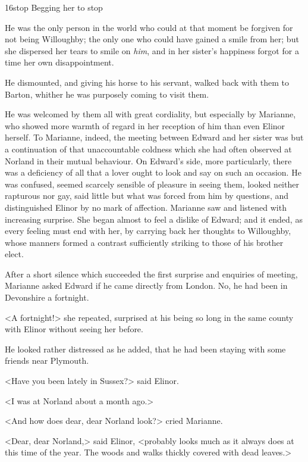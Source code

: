 \begin{bwbigpic}
	[1.0]
	{16stop} 
	{Begging her to stop} 
\end{bwbigpic}

He was the only person in the world who could at that moment be forgiven for not being Willoughby; the only one who could have gained a smile from her; but she dispersed her tears to smile on \textit{him}, and in her sister's happiness forgot for a time her own disappointment.

He dismounted, and giving his horse to his servant, walked back with them to Barton, whither he was purposely coming to visit them.

He was welcomed by them all with great cordiality, but especially by Marianne, who showed more warmth of regard in her reception of him than even Elinor herself. To Marianne, indeed, the meeting between Edward and her sister was but a continuation of that unaccountable coldness which she had often observed at Norland in their mutual behaviour. On Edward's side, more particularly, there was a deficiency of all that a lover ought to look and say on such an occasion. He was confused, seemed scarcely sensible of pleasure in seeing them, looked neither rapturous nor gay, said little but what was forced from him by questions, and distinguished Elinor by no mark of affection. Marianne saw and listened with increasing surprise. She began almost to feel a dislike of Edward; and it ended, as every feeling must end with her, by carrying back her thoughts to Willoughby, whose manners formed a contrast sufficiently striking to those of his brother elect.

After a short silence which succeeded the first surprise and enquiries of meeting, Marianne asked Edward if he came directly from London. No, he had been in Devonshire a fortnight.

<A fortnight!> she repeated, surprised at his being so long in the same county with Elinor without seeing her before.

He looked rather distressed as he added, that he had been staying with some friends near Plymouth.

<Have you been lately in Sussex?> said Elinor.

<I was at Norland about a month ago.>

<And how does dear, dear Norland look?> cried Marianne.

<Dear, dear Norland,> said Elinor, <probably looks much as it always does at this time of the year. The woods and walks thickly covered with dead leaves.>

